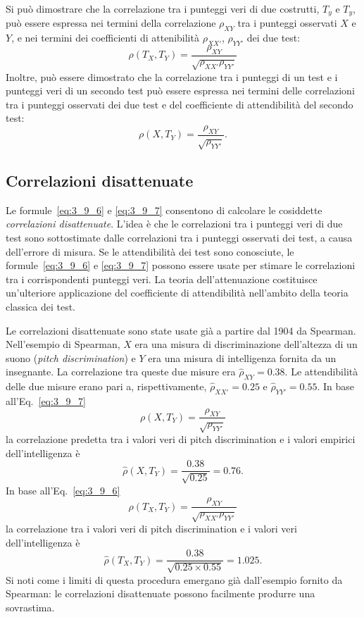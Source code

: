 Si può dimostrare che la correlazione tra i punteggi veri di
    due costrutti, $T_y$ e $T_y$, può essere espressa nei termini
    della correlazione $\rho_{XY}$ tra i punteggi osservati $X$ e $Y$,
    e nei termini dei coefficienti di attenibilità $\rho_{XX'}$,
    $\rho_{YY'}$ dei due test:
\begin{equation}
  \rho(T_X, T_Y)  = \frac{\rho_{XY}}{\sqrt{\rho_{XX'} \rho_{YY'}}}   
  \label{eq:3_9_6}
\end{equation}
Inoltre, può essere dimostrato che la correlazione tra i punteggi di un test e i punteggi veri di un secondo test può essere espressa nei termini delle correlazioni tra i punteggi osservati dei due test e del coefficiente di attendibilità del secondo test:
    \begin{equation}
      \rho(X, T_Y)  = \frac{\rho_{XY}}{\sqrt{\rho_{YY'}}}.
      \label{eq:3_9_7}
    \end{equation}

\subsection{Correlazioni disattenuate}

Le formule~\ref{eq:3_9_6} e \ref{eq:3_9_7} consentono di calcolare le
cosiddette  \emph{correlazioni disattenuate}.
  L'idea è che le
correlazioni tra i punteggi veri di due test sono sottostimate dalle
correlazioni tra i punteggi osservati dei test, a causa dell'errore di
misura. 
  Se le attendibilità dei test sono conosciute,
le formule~\ref{eq:3_9_6} e \ref{eq:3_9_7} possono essere usate per
stimare le  correlazioni tra i corrispondenti punteggi veri.
 La teoria dell'attenuazione costituisce un'ulteriore
  applicazione del coefficiente di attendibilità nell'ambito della
  teoria classica dei test.

Le correlazioni disattenuate sono state usate già a partire dal 1904
da Spearman.
  Nell'esempio di Spearman, $X$ era una misura di
discriminazione dell'altezza di un suono ({\it pitch discrimination})
e $Y$ era una misura di intelligenza fornita da un insegnante. 
 La
correlazione tra queste due misure era $\hat{\rho}_{XY}=0.38$. 
 Le
attendibilità delle due misure erano pari a, rispettivamente,
$\hat{\rho}_{XX'}= 0.25$ e  $\hat{\rho}_{YY'}= 0.55$.
In base all'Eq.~\ref{eq:3_9_7}
$$
\rho(X, T_Y)  = \frac{\rho_{XY}}{\sqrt{\rho_{YY'}}} 
$$
la correlazione predetta tra i valori veri di pitch discrimination e i
valori empirici dell'intelligenza è
$$
\hat{\rho}(X, T_Y)  =\frac{0.38}{\sqrt{0.25}}=0.76.
$$
In base all'Eq.~\ref{eq:3_9_6}
$$
\rho(T_X, T_Y)  = \frac{\rho_{XY}}{\sqrt{\rho_{XX'} \rho_{YY'}}} 
$$
 la correlazione tra i valori veri di pitch discrimination e i valori
 veri dell'intelligenza è   
$$
\hat{\rho}(T_X, T_Y)  =\frac{0.38}{\sqrt{0.25 \times 0.55}}=1.025.
$$ 
Si noti come  i limiti di questa procedura emergano  già dall'esempio fornito da Spearman: le correlazioni disattenuate possono facilmente produrre una sovrastima. 

